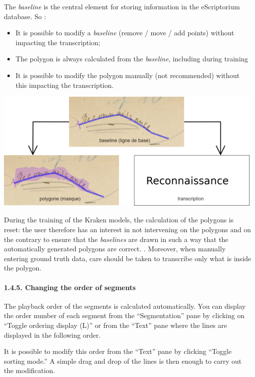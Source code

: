 \documentclass[
]{book}
\begin{document}
The \emph{baseline} is the central element for storing information in the
eScriptorium database. So :

\begin{itemize}
\item
  It is possible to modify a \emph{baseline} (remove / move / add points)
  without impacting the transcription;
\item
  The polygon is always calculated from the \emph{baseline}, including
  during training
\item
  It is possible to modify the polygon manually (not recommended)
  without this impacting the transcription.
\end{itemize}

\includegraphics[width=5.20833in,height=2.31944in]{img/eScrTut/image13.png}

During the training of the Kraken models, the calculation of the
polygons is reset: the user therefore has an interest in not intervening
on the polygons and on the contrary to ensure that the \emph{baselines} are
drawn in such a way that the automatically generated polygons are
correct. . Moreover, when manually entering ground truth data, care
should be taken to transcribe only what is inside the polygon.

\hypertarget{changing-the-order-of-segments}{%
\paragraph{1.4.5. Changing the order of segments}\label{changing-the-order-of-segments}}

The playback order of the segments is calculated automatically. You can
display the order number of each segment from the ``Segmentation'' pane by
clicking on ``Toggle ordering display (L)'' or from the ``Text'' pane where
the lines are displayed in the following order.

It is possible to modify this order from the ``Text'' pane by clicking
``Toggle sorting mode.'' A simple drag and drop of the lines is then
enough to carry out the modification.
\end{document}

